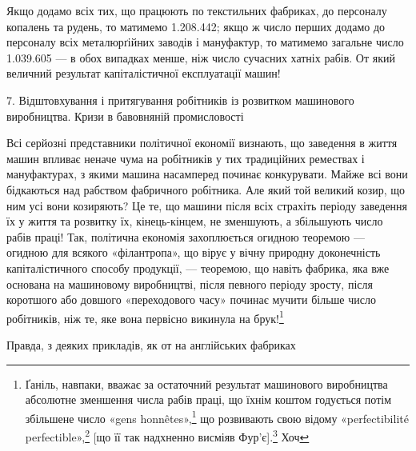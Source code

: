 Якщо додамо всіх тих, що працюють по текстильних фабриках,
до персоналу копалень та рудень, то матимемо 1.208.442;
якщо ж число перших додамо до персоналу всіх металюрґійних
заводів і мануфактур, то матимемо загальне число 1.039.605 —
в обох випадках менше, ніж число сучасних хатніх рабів. От
який величний результат капіталістичної експлуатації машин!

7. Відштовхування і притягування робітників із розвитком
машинового виробництва. Кризи в бавовняній промисловості

Всі серйозні представники політичної економії визнають,
що заведення в життя машин впливає неначе чума на робітників
у тих традиційних ремествах і мануфактурах, з якими машина
насамперед починає конкурувати. Майже всі вони бідкаються
над рабством фабричного робітника. Але який той великий козир,
що ним усі вони козиряють? Це те, що машини після всіх страхіть
періоду заведення їх у життя та розвитку їх, кінець-кінцем,
не зменшують, а збільшують число рабів праці! Так, політична
економія захоплюється огидною теоремою — огидною для всякого
«філантропа», що вірує у вічну природну доконечність капіталістичного
способу продукції, — теоремою, що навіть фабрика,
яка вже основана на машиновому виробництві, після певного
періоду зросту, після коротшого або довшого «переходового
часу» починає мучити більше число робітників, ніж те, яке вона
первісно викинула на брук!\footnote{
Ґаніль, навпаки, вважає за остаточний результат машинового виробництва
абсолютне зменшення числа рабів праці, що їхнім коштом годується
потім збільшене число «gens honnêtes»,\footnote*{
— порядних людей. \emph{Ред.}
} що розвивають свою відому
«perfectibilité perfectible»,\footnote*{
— здібну вдосконалюватися здібність до вдосконалення. \emph{Ред.}
} [що її так надхненно висміяв Фур’є].\footnote*{
Заведений у прямі дужки кінець речення беремо з французького
видання. \emph{Ред.}
} Хоч
}

Правда, з деяких прикладів, як от на англійських фабриках

